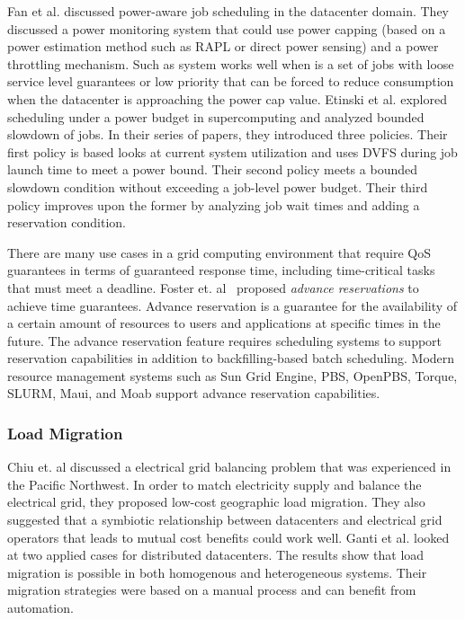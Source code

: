 Fan et al. \cite{PowerAwareServer1} discussed power-aware job scheduling in the
datacenter domain. They discussed a power monitoring system that could use
power capping (based on a power estimation method such as RAPL or direct power
sensing) and a power throttling mechanism. Such as system works well when is a
set of jobs with loose service level guarantees or low priority that can be
forced to reduce consumption when the datacenter is approaching the power cap
value. Etinski et al. \cite{Etinski1,Etinski2,Etinski3,Etinski4} explored
scheduling under a power budget in supercomputing and analyzed bounded slowdown
of jobs. In their series of papers, they introduced three policies. Their first
policy is based looks at current system utilization and uses DVFS during job
launch time to meet a power bound. Their second policy meets a bounded slowdown
condition without exceeding a job-level power budget. Their third policy
improves upon the former by analyzing job wait times and adding a reservation
condition. 

There are many use cases in a grid computing environment that require QoS
guarantees in terms of guaranteed response time, including time-critical tasks
that must meet a deadline. Foster et. al~\cite{foster_distributed_1999,foster_anatomy_2001} proposed \emph{advance
reservations} to achieve time guarantees. Advance reservation is a guarantee for
the availability of a certain amount of resources to users and applications at
specific times in the future. The advance reservation feature requires
scheduling systems to support reservation capabilities in addition to
backfilling-based batch scheduling. Modern resource management systems such as
Sun Grid Engine, PBS, OpenPBS, Torque, SLURM, Maui, and Moab support advance
reservation capabilities.

\subsubsection{Load Migration}
Chiu et. al \cite{chiu_electric_2012} discussed a electrical grid balancing
problem that was experienced in the Pacific Northwest. In order to match
electricity supply and balance the electrical grid, they proposed low-cost
geographic load migration. They also suggested that a symbiotic relationship
between datacenters and electrical grid operators that leads to mutual cost
benefits could work well. Ganti et al. \cite{Ghatikar2012b} looked at two
applied cases for distributed datacenters. The results show that load migration
is possible in both homogenous and heterogeneous systems. Their migration
strategies were based on a manual process and can benefit from automation.


